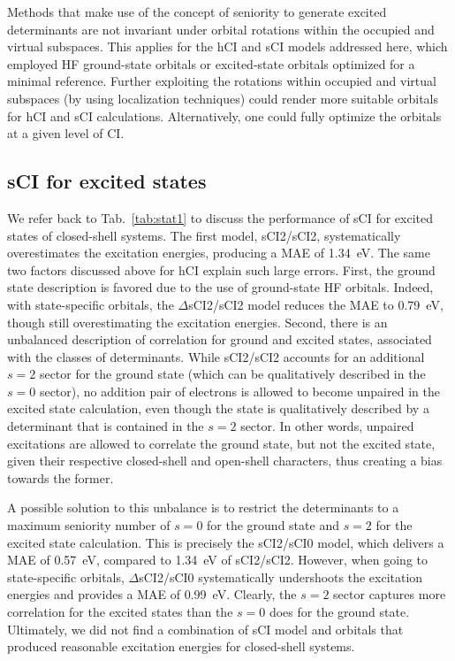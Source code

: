 \documentclass[aip,jcp,reprint,noshowkeys,superscriptaddress]{revtex4-1}
\begin{document}
Methods that make use of the concept of seniority to generate excited determinants 
are not invariant under orbital rotations within the occupied and virtual subspaces. \cite{Bytautas_2011,Limacher_2014,Stein_2014}
This applies for the hCI and sCI models addressed here,
which employed HF ground-state orbitals or excited-state orbitals optimized for a minimal reference.
Further exploiting the rotations within occupied and virtual subspaces (by using localization techniques) could render more suitable orbitals for hCI and sCI calculations.
Alternatively, one could fully optimize the orbitals at a given level of CI. \cite{Kossoski_2022}


\subsection{sCI for excited states}
\label{sec:res_D}

We refer back to Tab.~\ref{tab:stat1} to discuss the performance of sCI for excited states of closed-shell systems.
The first model, sCI2/sCI2, systematically overestimates the excitation energies, producing a MAE of \SI{1.34}{\eV}.
The same two factors discussed above for hCI explain such large errors.
First, the ground state description is favored due to the use of ground-state HF orbitals.
Indeed, with state-specific orbitals, the $\Delta$sCI2/sCI2 model reduces the MAE to \SI{0.79}{\eV}, though still overestimating the excitation energies.
Second, there is an unbalanced description of correlation for ground and excited states, associated with the classes of determinants.
While sCI2/sCI2 accounts for an additional $s=2$ sector for the ground state (which can be qualitatively described in the $s=0$ sector),
no addition pair of electrons is allowed to become unpaired in the excited state calculation, even though the state is qualitatively described by a determinant that is contained in the $s=2$ sector.
In other words, unpaired excitations are allowed to correlate the ground state, but not the excited state, given their respective closed-shell and open-shell characters, 
thus creating a bias towards the former.

A possible solution to this unbalance is to restrict the determinants to a maximum seniority number of $s=0$ for the ground state and $s=2$ for the excited state calculation.
This is precisely the sCI2/sCI0 model, which delivers a MAE of \SI{0.57}{\eV}, compared to \SI{1.34}{\eV} of sCI2/sCI2.
However, when going to state-specific orbitals, $\Delta$sCI2/sCI0 systematically undershoots the excitation energies and provides a MAE of \SI{0.99}{\eV}.
Clearly, the $s=2$ sector captures more correlation for the excited states than the $s=0$ does for the ground state.
Ultimately, we did not find a combination of sCI model and orbitals that produced reasonable excitation energies for closed-shell systems.
\end{document}
